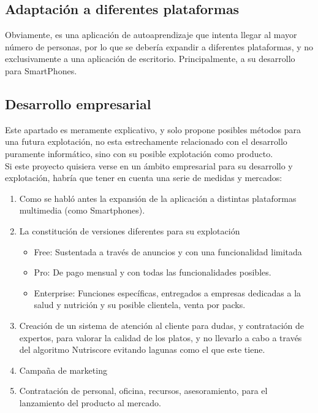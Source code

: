 \subsection{Adaptación a diferentes plataformas}
Obviamente, es una aplicación de autoaprendizaje que intenta llegar al mayor número de personas, por lo que se debería expandir a diferentes plataformas, y no exclusivamente a una aplicación de escritorio. Principalmente, a su desarrollo para SmartPhones.
\subsection{Desarrollo empresarial}
Este apartado es meramente explicativo, y solo propone posibles métodos para una futura explotación, no esta estrechamente relacionado con el desarrollo puramente informático, sino con su posible explotación como producto.
\\

Si este proyecto quisiera verse en un ámbito empresarial para su desarrollo y explotación, habría que tener en cuenta una serie de medidas y mercados:
\begin{enumerate}
\item	Como se habló antes la expansión de la aplicación a distintas plataformas multimedia (como Smartphones).
\item	La constitución de versiones diferentes para su explotación
\begin{itemize}
\item	Free: Sustentada a través de anuncios y con una funcionalidad limitada
\item	Pro: De pago mensual y con todas las funcionalidades posibles.
\item	Enterprise: Funciones específicas, entregados a empresas dedicadas a la salud y nutrición y su posible clientela, venta por packs.
\end{itemize}
\item	Creación de un sistema de atención al cliente para dudas, y contratación de expertos, para valorar la calidad de los platos, y no llevarlo a cabo a través del algoritmo Nutriscore evitando lagunas como el que este tiene.
\item	Campaña de marketing
\item	Contratación de personal, oficina, recursos, asesoramiento, para el lanzamiento del producto al mercado.
\end{enumerate}
